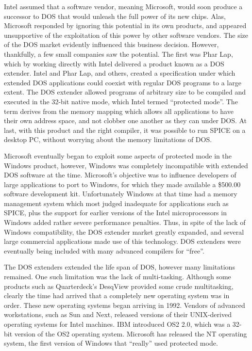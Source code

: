 Intel assumed that a software vendor, meaning Microsoft, would soon
produce a successor to DOS that would unleash the full power of its
new chips.  Alas, Microsoft responded by ignoring this potential in
its own products, and appeared unsupportive of the exploitation of
this power by other software vendors.  The size of the DOS market
evidently influenced this business decision.  However, thankfully, a
few small companies saw the potential.  The first was Phar Lap, which
by working directly with Intel delivered a product known as a DOS
extender.  Intel and Phar Lap, and others, created a specification
under which extended DOS applications could coexist with regular DOS
programs to a large extent.  The DOS extender allowed programs of
arbitrary size to be compiled and executed in the 32-bit native mode,
which Intel termed ``protected mode''.  The term derives from the memory
mapping which allows all applications to have their own address space,
and not clobber one another as they can under DOS.  At last, with this
product and the right compiler, it was possible to run SPICE on a
desktop PC, without worrying about the memory limitations of DOS.

Microsoft eventually began to exploit some aspects of protected mode
in the Windows product, however, Windows was completely incompatible
with extended DOS software at the time.  Microsoft's objective was to
influence developers of large applications to port to Windows, for
which they made available a \$500.00 software development kit. 
Unfortunately Windows at that time had a memory management system
which most judged inadequate for applications such as SPICE, plus the
support for earlier versions of the Intel microprocessors in Windows
added rather severe performance penalties.  Thus, in spite of the lack
of Windows compatibility, the DOS extender market greatly expanded,
and several large commercial applications made use of this technology. 
DOS extenders were eventually being included with many advanced
compilers for ``free''.

The DOS extenders extended the life span of DOS, however many
limitations remained.  One such limitation was the lack of
multi-tasking.  Although some products such as Quarterdeck's DesqView
provided some crude multitasking, clearly the time had arrived that a
completely new operating system was in order.  These new operating
systems began arriving in 1992.  Vendors of advanced workstations,
such as Sun and Next, released versions of their UNIX-derived
operating systems for Intel machines.  IBM introduced OS2 2.0, which
was a 32-bit version of the OS2 operating system.  Microsoft has
released the NT operating system, the first version of Windows that
``really'' used protected mode.

